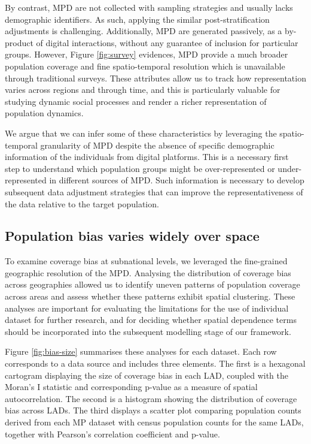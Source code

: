 \documentclass[]{rsos}%
\begin{document}
By contrast, MPD are not collected with sampling strategies and
usually lacks demographic identifiers. As such, applying the similar
post-stratification adjustments is challenging. Additionally, MPD are generated passively, as a by-product of digital interactions, without any guarantee of inclusion
for particular groups. However, Figure \ref{fig:survey} evidences, MPD provide a much broader population coverage and fine spatio-temporal resolution which is unavailable through traditional surveys. These attributes allow us to track how representation varies across regions and through time, and
this is particularly valuable for studying dynamic social processes and render a richer representation of population dynamics.

We argue that we
can infer some of these characteristics by leveraging the
spatio-temporal granularity of MPD despite the absence of specific demographic
information of the individuals from digital platforms. This is a necessary first step
to understand which population groups might be over-represented or
under-represented in different sources of MPD. Such information is
necessary to develop subsequent data adjustment strategies that can
improve the representativeness of the data relative to the target
population.

\subsection{Population bias varies widely over space}\label{population-bias-varies-widely-over-space}

To examine coverage bias at subnational levels, we leveraged the
fine-grained geographic resolution of the MPD. Analysing
the distribution of coverage bias across geographies allowed us to
identify uneven patterns of population coverage across areas and assess
whether these patterns exhibit spatial clustering. These analyses
are important for evaluating the limitations for the use of individual dataset for
further research, and for deciding whether spatial dependence terms
should be incorporated into the subsequent modelling stage of our framework.

Figure \ref{fig:bias-size} summarises these analyses for each dataset.
Each row corresponds to a data source and includes three elements. The first is a
hexagonal cartogram displaying the size of coverage bias in each LAD,
coupled with the Moran's I statistic and corresponding p-value as a measure
of spatial autocorrelation. The second is a histogram showing the distribution of
coverage bias across LADs. The third displays a scatter plot comparing population
counts derived from each MP dataset with census population counts for
the same LADs, together with Pearson's correlation coefficient and
p-value.
\end{document}
